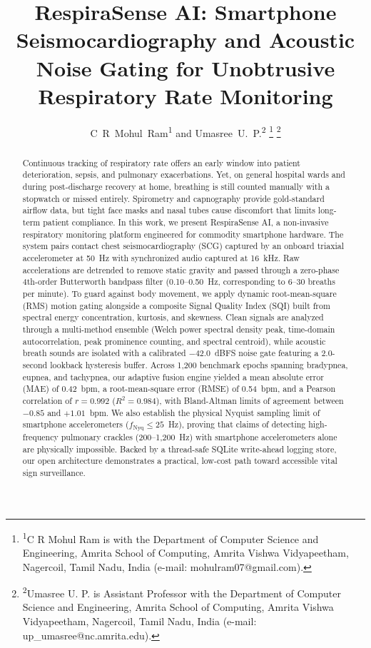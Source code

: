 \documentclass[journal,10pt,twocolumn]{IEEEtran}
\begin{document}
\title{RespiraSense AI: Smartphone Seismocardiography and Acoustic Noise Gating for Unobtrusive Respiratory Rate Monitoring}

\author{C~R~Mohul~Ram\textsuperscript{1} and Umasree~U.~P.\textsuperscript{2}%
\thanks{\textsuperscript{1}C R Mohul Ram is with the Department of Computer Science and Engineering, Amrita School of Computing, Amrita Vishwa Vidyapeetham, Nagercoil, Tamil Nadu, India (e-mail: mohulram07@gmail.com).}%
\thanks{\textsuperscript{2}Umasree U. P. is Assistant Professor with the Department of Computer Science and Engineering, Amrita School of Computing, Amrita Vishwa Vidyapeetham, Nagercoil, Tamil Nadu, India (e-mail: up\_umasree@nc.amrita.edu).}}

\maketitle

\begin{abstract}
Continuous tracking of respiratory rate offers an early window into patient deterioration, sepsis, and pulmonary exacerbations. Yet, on general hospital wards and during post-discharge recovery at home, breathing is still counted manually with a stopwatch or missed entirely. Spirometry and capnography provide gold-standard airflow data, but tight face masks and nasal tubes cause discomfort that limits long-term patient compliance. In this work, we present RespiraSense AI, a non-invasive respiratory monitoring platform engineered for commodity smartphone hardware. The system pairs contact chest seismocardiography (SCG) captured by an onboard triaxial accelerometer at 50~Hz with synchronized audio captured at 16~kHz. Raw accelerations are detrended to remove static gravity and passed through a zero-phase 4th-order Butterworth bandpass filter (0.10--0.50~Hz, corresponding to 6--30 breaths per minute). To guard against body movement, we apply dynamic root-mean-square (RMS) motion gating alongside a composite Signal Quality Index (SQI) built from spectral energy concentration, kurtosis, and skewness. Clean signals are analyzed through a multi-method ensemble (Welch power spectral density peak, time-domain autocorrelation, peak prominence counting, and spectral centroid), while acoustic breath sounds are isolated with a calibrated $-42.0$~dBFS noise gate featuring a 2.0-second lookback hysteresis buffer. Across 1,200 benchmark epochs spanning bradypnea, eupnea, and tachypnea, our adaptive fusion engine yielded a mean absolute error (MAE) of 0.42~bpm, a root-mean-square error (RMSE) of 0.54~bpm, and a Pearson correlation of $r = 0.992$ ($R^2 = 0.984$), with Bland-Altman limits of agreement between $-0.85$ and $+1.01$~bpm. We also establish the physical Nyquist sampling limit of smartphone accelerometers ($f_{\text{Nyq}} \le 25$~Hz), proving that claims of detecting high-frequency pulmonary crackles (200--1,200~Hz) with smartphone accelerometers alone are physically impossible. Backed by a thread-safe SQLite write-ahead logging store, our open architecture demonstrates a practical, low-cost path toward accessible vital sign surveillance.
\end{abstract}
\end{document}
